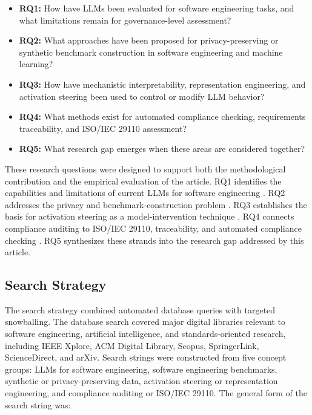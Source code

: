 \documentclass{ieeeaccess}
\begin{document}
\begin{itemize}
    \item \textbf{RQ1:} How have LLMs been evaluated for software engineering tasks, and what limitations remain for governance-level assessment?
    \item \textbf{RQ2:} What approaches have been proposed for privacy-preserving or synthetic benchmark construction in software engineering and machine learning?
    \item \textbf{RQ3:} How have mechanistic interpretability, representation engineering, and activation steering been used to control or modify LLM behavior?
    \item \textbf{RQ4:} What methods exist for automated compliance checking, requirements traceability, and ISO/IEC 29110 assessment?
    \item \textbf{RQ5:} What research gap emerges when these areas are considered together?
\end{itemize}

These research questions were designed to support both the methodological contribution and the empirical evaluation of the article. RQ1 identifies the capabilities and limitations of current LLMs for software engineering \cite{jiang2024surveycodegen,lu2021codexglue,jimenez2023swebench,jain2024livecodebench}. RQ2 addresses the privacy and benchmark-construction problem \cite{bauer2024syntheticdata,yang2025swesmith,hernandez2024codeduplication,zhou2025lessleak}. RQ3 establishes the basis for activation steering as a model-intervention technique \cite{zou2023representation,turner2023activation,li2023iti}. RQ4 connects compliance auditing to ISO/IEC 29110, traceability, and automated compliance checking \cite{iso29110_2024,laporte2016vse,castellanos2022processcompliance,antoniol2002traceability,borg2013traceability}. RQ5 synthesizes these strands into the research gap addressed by this article.

\subsection{Search Strategy}
\label{subsec:slr_search_strategy}

The search strategy combined automated database queries with targeted snowballing. The database search covered major digital libraries relevant to software engineering, artificial intelligence, and standards-oriented research, including IEEE Xplore, ACM Digital Library, Scopus, SpringerLink, ScienceDirect, and arXiv. Search strings were constructed from five concept groups: LLMs for software engineering, software engineering benchmarks, synthetic or privacy-preserving data, activation steering or representation engineering, and compliance auditing or ISO/IEC 29110. The general form of the search string was:
\end{document}
